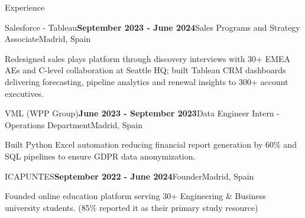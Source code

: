 \documentclass[11pt]{resume}
\begin{document}
\begin{rSection}{Experience}
    \begin{rSubsection}{Salesforce - Tableau}{\textbf{September 2023 - June 2024}}{Sales Programs and Strategy Associate}{Madrid, Spain}
    \item Redesigned sales plays platform through discovery interviews with 30+ EMEA AEs and C-level collaboration at Seattle HQ; built Tableau CRM dashboards delivering forecasting, pipeline analytics and renewal insights to 300+ account executives.
    \end{rSubsection}

    \begin{rSubsection}{VML (WPP Group)}{\textbf{June 2023 - September 2023}}{Data Engineer Intern - Operations Department}{Madrid, Spain}
        \item Built Python Excel automation reducing financial report generation by 60\% and SQL pipelines to ensure GDPR data anonymization.
    \end{rSubsection}

    \begin{rSubsection}{ICAPUNTES}{\textbf{September 2022 - June 2024}}{Founder}{Madrid, Spain}
        \item Founded online education platform serving 30+ Engineering \& Business university students. (85\% reported it as their primary study resource)
    \end{rSubsection}

\end{rSection}
\end{document}
